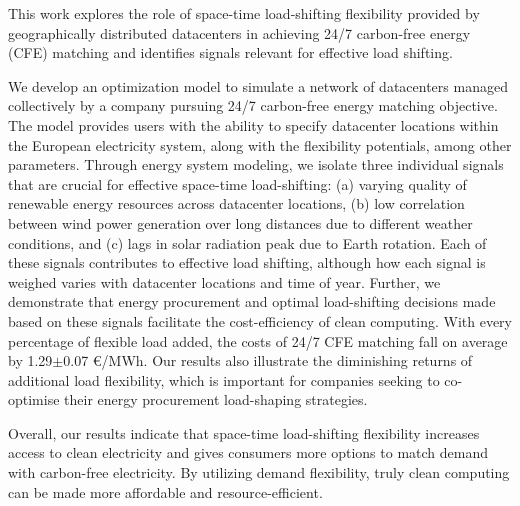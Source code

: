 %

This work explores the role of space-time load-shifting flexibility provided by geographically distributed datacenters in achieving 24/7 carbon-free energy (CFE) matching and identifies signals relevant for effective load shifting.

We develop an optimization model to simulate a network of datacenters managed collectively by a company pursuing 24/7 carbon-free energy matching objective.
The model provides users with the ability to specify datacenter locations within the European electricity system, along with the flexibility potentials, among other parameters.
Through energy system modeling, we isolate three individual signals that are crucial for effective space-time load-shifting: (a) varying quality of renewable energy resources across datacenter locations, (b) low correlation between wind power generation over long distances due to different weather conditions, and (c) lags in solar radiation peak due to Earth rotation. Each of these signals contributes to effective load shifting, although how each signal is weighed varies with datacenter locations and time of year.
Further, we demonstrate that energy procurement and optimal load-shifting decisions made based on these signals facilitate the cost-efficiency of clean computing. With every percentage of flexible load added, the costs of 24/7 CFE matching fall on average by 1.29$\pm$0.07 \euro/MWh. Our results also illustrate the diminishing returns of additional load flexibility, which is important for companies seeking to co-optimise their energy procurement load-shaping strategies.

Overall, our results indicate that space-time load-shifting flexibility increases access to clean electricity and gives consumers more options to match demand with carbon-free electricity. By utilizing demand flexibility, truly clean computing can be made more affordable and resource-efficient.